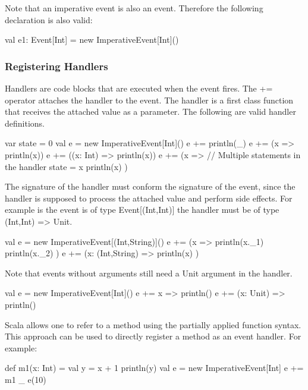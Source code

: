 \documentclass[10pt,a4paper]{article}
\newcommand{\code}[1]{{\fontfamily{cmtt}\small\selectfont#1}}
\begin{document}
Note that an imperative event is also an event. Therefore the
following declaration is also valid:

\begin{codenv}
val e1: Event[Int] = new ImperativeEvent[Int]()
\end{codenv}



\subsubsection{Registering Handlers}

Handlers are code blocks that are executed when the event fires. The
\code{+=} operator attaches the handler to the event. The handler is a
first class function that receives the attached value as a parameter.
The following are valid handler definitions.

\begin{codenv}
var state = 0
val e = new ImperativeEvent[Int]()
e += { println(_) }
e += (x => println(x))
e += ((x: Int) => println(x))
e += (x => {  // Multiple statements in the handler
  state = x 
  println(x)
})
\end{codenv}

The signature of the handler must conform the signature of the event,
since the handler is supposed to process the attached value and
perform side effects. For example is the event is of type
\code{Event[(Int,Int)]} the handler must be of type \code{(Int,Int) =>
  Unit}.

\begin{codenv}
val e = new ImperativeEvent[(Int,String)]()
e += (x => {
  println(x._1)
  println(x._2)
})
e += (x: (Int,String) => {
  println(x)
})
\end{codenv}

Note that events without arguments still need a \code{Unit} argument
in the handler.

\begin{codenv}
val e = new ImperativeEvent[Int]()
e += { x => println() }
e += { (x: Unit) => println() }
\end{codenv}

Scala allows one to refer to a method using the partially applied
function syntax. This approach can be used to directly register a
method as an event handler. For example:

\begin{codenv}
def m1(x: Int) = { 
  val y = x + 1
  println(y) 
}    
val e = new ImperativeEvent[Int]
e += m1 _
e(10)
\end{codenv}
\end{document}
